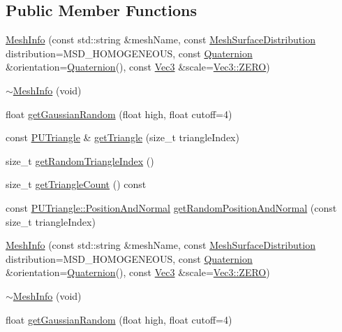 \subsection*{Public Member Functions}
\begin{DoxyCompactItemize}
\item 
\hyperlink{classMeshInfo_a5ccfea990dba31ade66e5358b05b20b6}{Mesh\+Info} (const std\+::string \&mesh\+Name, const \hyperlink{classMeshInfo_aadc99105abbc3bd033e33c6ba512a13b}{Mesh\+Surface\+Distribution} distribution=M\+S\+D\+\_\+\+H\+O\+M\+O\+G\+E\+N\+E\+O\+US, const \hyperlink{classQuaternion}{Quaternion} \&orientation=\hyperlink{classQuaternion}{Quaternion}(), const \hyperlink{classVec3}{Vec3} \&scale=\hyperlink{classVec3_a26c0c52a5fba36ed0ef5e6d5026569f4}{Vec3\+::\+Z\+E\+RO})
\item 
\hyperlink{classMeshInfo_aff7c5864479b8923d156aa04f27dfb3b}{$\sim$\+Mesh\+Info} (void)
\item 
float \hyperlink{classMeshInfo_a1414c8a370c9878dafb0757c99d3b737}{get\+Gaussian\+Random} (float high, float cutoff=4)
\item 
const \hyperlink{classPUTriangle}{P\+U\+Triangle} \& \hyperlink{classMeshInfo_a2ec71f7f8851125bf1ded381ae39e0f0}{get\+Triangle} (size\+\_\+t triangle\+Index)
\item 
size\+\_\+t \hyperlink{classMeshInfo_a7e3355c03d8c7e8147d563cac098094f}{get\+Random\+Triangle\+Index} ()
\item 
size\+\_\+t \hyperlink{classMeshInfo_a5e2ff519d1987d26101a6e40527a9571}{get\+Triangle\+Count} () const
\item 
const \hyperlink{structPUTriangle_1_1PositionAndNormal}{P\+U\+Triangle\+::\+Position\+And\+Normal} \hyperlink{classMeshInfo_aa4e919b45d5c74e273fe94b1ab44f385}{get\+Random\+Position\+And\+Normal} (const size\+\_\+t triangle\+Index)
\item 
\hyperlink{classMeshInfo_a5ccfea990dba31ade66e5358b05b20b6}{Mesh\+Info} (const std\+::string \&mesh\+Name, const \hyperlink{classMeshInfo_aadc99105abbc3bd033e33c6ba512a13b}{Mesh\+Surface\+Distribution} distribution=M\+S\+D\+\_\+\+H\+O\+M\+O\+G\+E\+N\+E\+O\+US, const \hyperlink{classQuaternion}{Quaternion} \&orientation=\hyperlink{classQuaternion}{Quaternion}(), const \hyperlink{classVec3}{Vec3} \&scale=\hyperlink{classVec3_a26c0c52a5fba36ed0ef5e6d5026569f4}{Vec3\+::\+Z\+E\+RO})
\item 
\hyperlink{classMeshInfo_aff7c5864479b8923d156aa04f27dfb3b}{$\sim$\+Mesh\+Info} (void)
\item 
float \hyperlink{classMeshInfo_a1414c8a370c9878dafb0757c99d3b737}{get\+Gaussian\+Random} (float high, float cutoff=4)

\end{DoxyCompactItemize}
